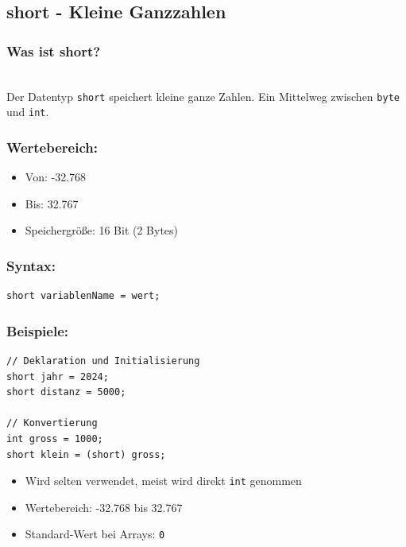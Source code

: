 \newpage


\subsection*{short - Kleine Ganzzahlen}

\subsubsection*{Was ist short?}\\
Der Datentyp \texttt{short} speichert kleine ganze Zahlen.
Ein Mittelweg zwischen \texttt{byte} und \texttt{int}.

\subsubsection*{Wertebereich:}
\begin{itemize}
	\item Von: -32.768
	\item Bis: 32.767
	\item Speichergröße: 16 Bit (2 Bytes)
\end{itemize}

\subsubsection*{Syntax:}
\begin{lstlisting}
short variablenName = wert;
\end{lstlisting}

\subsubsection*{Beispiele:}
\begin{lstlisting}
// Deklaration und Initialisierung
short jahr = 2024;
short distanz = 5000;

// Konvertierung
int gross = 1000;
short klein = (short) gross;
\end{lstlisting}

\begin{achtung}
	\begin{itemize}
		\item Wird selten verwendet, meist wird direkt \texttt{int} genommen
		\item Wertebereich: -32.768 bis 32.767
		\item Standard-Wert bei Arrays: \texttt{0}
	\end{itemize}
\end{achtung}

